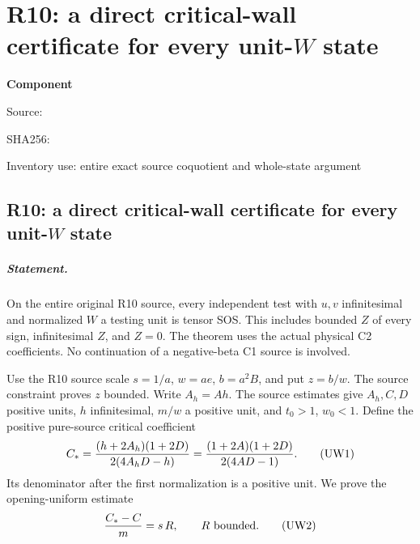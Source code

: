 \chapter{R10: a direct critical-wall certificate for every unit-$W$ state}
\label{component:pf1aac1dff7c7}
\noindent\textbf{Component }\par
{\small\noindent Source: \par}
{\small\noindent SHA256: \par}
{\small\noindent Inventory use: entire exact source coquotient and whole-state argument\par}
\medskip
\section{R10: a direct critical-wall certificate for every unit-$W$ state}
\paragraph{Statement.}
On the entire original R10 source, every independent test with $u,v$
infinitesimal and normalized $W$ a testing unit is tensor SOS. This
includes bounded $Z$ of every sign, infinitesimal $Z$, and $Z=0$.
The theorem uses the actual physical C2 coefficients. No continuation
of a negative-beta C1 source is involved.

Use the R10 source scale $s=1/a$, $w=ae$, $b=a^2B$, and put
$z=b/w$. The source constraint proves $z$ bounded. Write $A_h=Ah$.
The source estimates give $A_h,C,D$ positive units, $h$ infinitesimal,
$m/w$ a positive unit, and $t_0>1$, $w_0<1$.
Define the positive pure-source critical coefficient
\[
 C_*={ (h+2A_h)(1+2D)\over 2(4A_hD-h)}
     ={(1+2A)(1+2D)\over2(4AD-1)}.
 \tag{UW1}
\]
Its denominator after the first normalization is a positive unit.
We prove the opening-uniform estimate
\[
                 {C_*-C\over m}=s\,R,
                 \qquad R\text{ bounded}.             \tag{UW2}
\]

